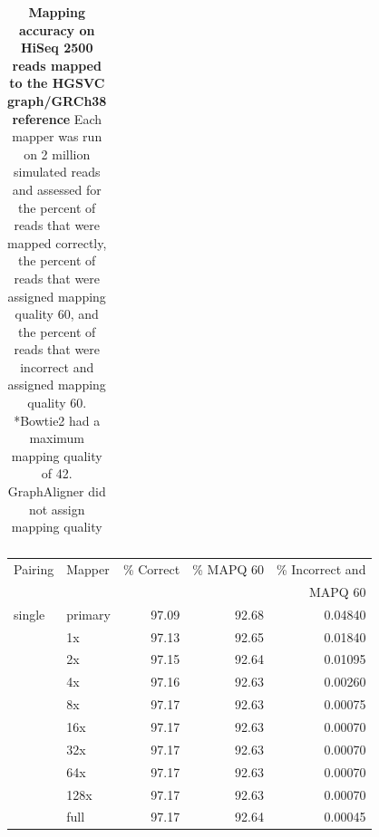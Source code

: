 \documentclass[11pt]{ucscthesis}
\begin{document}
\begin{table}[p]
\begin{tabular}{|l|l|r|r|r|}
        \hline
        
    \end{tabular}
    \caption[Mapping accuracy on HiSeq 2500 reads mapped to the HGSVC graph/GRCh38 reference]{\textbf{Mapping accuracy on HiSeq 2500 reads mapped to the HGSVC graph/GRCh38 reference} Each mapper was run on 2 million simulated reads and assessed for the percent of reads that were mapped correctly, the percent of reads that were assigned mapping quality 60, and the percent of reads that were incorrect and assigned mapping quality 60. *Bowtie2 had a maximum mapping quality of 42. GraphAligner did not assign mapping quality}
    \label{tab:mapping_accuracy_hgsvc_hiseq2500}
\end{table}

\begin{table}[p]
    \centering
    \begin{tabular}{|l|l|r|r|r|}
    \hline
        Pairing & Mapper & \% Correct & \% MAPQ 60 & \% Incorrect and \\
               &         &            &            & MAPQ 60          \\
        \hline
        single  & primary	& 97.09     & 92.68     & 0.04840 \\
                & 1x	    & 97.13     & 92.65     & 0.01840 \\
                & 2x	    & 97.15     & 92.64     & 0.01095 \\
                & 4x	    & 97.16     & 92.63     & 0.00260 \\
                & 8x	    & 97.17     & 92.63     & 0.00075 \\
                & 16x	    & 97.17     & 92.63     & 0.00070 \\
                & 32x	    & 97.17     & 92.63     & 0.00070 \\
                & 64x   	& 97.17     & 92.63     & 0.00070 \\
                & 128x	    & 97.17     & 92.63     & 0.00070 \\
                & full  	& 97.17     & 92.64     & 0.00045 \\

                
                


\end{tabular}
\end{table}
\end{document}
